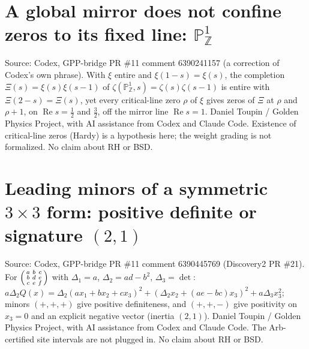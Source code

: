 \documentclass{report}
\theoremstyle{definition}
\begin{document}
\begin{itemize}
\begin{itemize}
\section{A global mirror does not confine zeros to its fixed line: \texorpdfstring{$\mathbb P^1_{\mathbb Z}$}{P1}}
Source: Codex, GPP-bridge PR \#11 comment 6390241157 (a correction of Codex's own phrase). With $\xi$ entire and $\xi(1-s)=\xi(s)$, the completion
$\Xi(s)=\xi(s)\xi(s-1)$ of $\zeta(\mathbb P^1_{\mathbb Z},s)=\zeta(s)\zeta(s-1)$ is entire with $\Xi(2-s)=\Xi(s)$, yet every critical-line zero $\rho$ of $\xi$ gives zeros of $\Xi$ at
$\rho$ and $\rho+1$, on $\operatorname{Re}s=\tfrac12$ and $\tfrac32$, off the mirror line $\operatorname{Re}s=1$. Daniel Toupin / Golden Physics Project, with AI assistance from Codex and
Claude Code. Existence of critical-line zeros (Hardy) is a hypothesis here; the weight grading is not formalized. No claim about RH or BSD.

\section{Leading minors of a symmetric \texorpdfstring{$3\times3$}{3x3} form: positive definite or signature \texorpdfstring{$(2,1)$}{(2,1)}}
Source: Codex, GPP-bridge PR \#11 comment 6390445769 (Discovery2 PR \#21). For $\begin{psmallmatrix}a&b&c\\b&d&e\\c&e&f\end{psmallmatrix}$ with $\Delta_1=a$, $\Delta_2=ad-b^2$, $\Delta_3=\det$:
$a\Delta_2Q(x)=\Delta_2(ax_1+bx_2+cx_3)^2+(\Delta_2x_2+(ae-bc)x_3)^2+a\Delta_3x_3^2$; minors $(+,+,+)$ give positive definiteness, and $(+,+,-)$ give positivity on $x_3=0$ and an
explicit negative vector (inertia $(2,1)$). Daniel Toupin / Golden Physics Project, with AI assistance from Codex and Claude Code. The Arb-certified site intervals are not
plugged in. No claim about RH or BSD.


\end{itemize}
\end{itemize}
\end{document}

